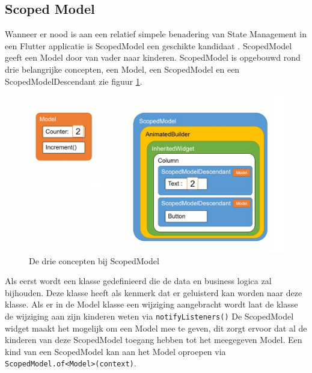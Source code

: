 \subsection{Scoped Model}
Wanneer er nood is aan een relatief simpele benadering van State Management in een Flutter applicatie is ScopedModel een geschikte kandidaat \autocite{Boelens2019}. ScopedModel geeft een Model door van vader naar kinderen. ScopedModel is opgebouwd rond drie belangrijke concepten, een Model, een ScopedModel en een ScopedModelDescendant zie figuur \ref{fig:scopedmodel}. 

\begin{figure}[H]
    \includegraphics[width=\linewidth]{img/stand-van-zaken/scopedmodel.jpg}
    \caption{De drie concepten bij ScopedModel \autocite{Boelens2019}}
    \label{fig:scopedmodel}
\end{figure}
Als eerst wordt een klasse gedefinieerd die de 
data en business logica zal bijhouden. Deze klasse heeft als kenmerk dat er geluisterd kan worden naar deze klasse. Als er in de Model klasse een wijziging aangebracht wordt laat de klasse de wijziging aan zijn kinderen weten via \verb|notifyListeners()|
\newline
De ScopedModel widget maakt het mogelijk om een Model mee te geven, dit zorgt ervoor dat al de kinderen van deze ScopedModel toegang hebben tot het meegegeven Model. Een kind van een ScopedModel kan aan het Model oproepen via \verb|ScopedModel.of<Model>(context)|.

